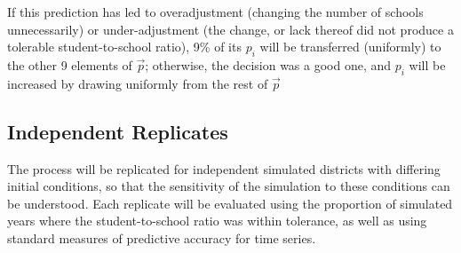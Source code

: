 \documentclass{article}
\begin{document}
If this prediction has led to overadjustment (changing the number of schools unnecessarily) or under-adjustment (the change, or lack thereof did not produce a tolerable student-to-school ratio), 9\% of its $p_i$ will be transferred (uniformly) to the other 9 elements of $\vec{p}$; otherwise, the decision was a good one, and $p_i$ will be increased by drawing uniformly from the rest of $\vec{p}$


\subsection*{Independent Replicates}
The process will be replicated for independent simulated districts with differing initial conditions, so that the sensitivity of the simulation to these conditions can be understood. Each replicate will be evaluated using the proportion of simulated years where the student-to-school ratio was within tolerance, as well as using standard measures of predictive accuracy for time series.

\medskip

\printbibliography
\end{document}
